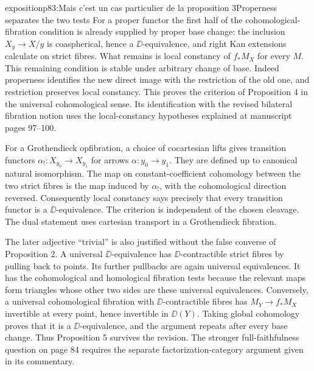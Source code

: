 \begin{dcomment}{exposition}{p83:Mais c'est un cas particulier de la proposition 3}{Properness separates the two tests}
For a proper functor the first half of the cohomological-fibration condition is already supplied by proper base change: the inclusion $X_y\to X/y$ is coaspherical, hence a $\DD$-equivalence, and right Kan extensions calculate on strict fibres. What remains is local constancy of $f_*M_X$ for every $M$. This remaining condition is stable under arbitrary change of base. Indeed properness identifies the new direct image with the restriction of the old one, and restriction preserves local constancy. This proves the criterion of Proposition 4 in the universal cohomological sense. Its identification with the revised bilateral fibration notion uses the local-constancy hypotheses explained at manuscript pages 97--100.

For a Grothendieck opfibration, a choice of cocartesian lifts gives transition functors $\alpha_!:X_{y_0}\to X_{y_1}$ for arrows $\alpha:y_0\to y_1$. They are defined up to canonical natural isomorphism. The map on constant-coefficient cohomology between the two strict fibres is the map induced by $\alpha_!$, with the cohomological direction reversed. Consequently local constancy says precisely that every transition functor is a $\DD$-equivalence. The criterion is independent of the chosen cleavage. The dual statement uses cartesian transport in a Grothendieck fibration.

The later adjective ``trivial'' is also justified without the false converse of Proposition 2. A universal $\DD$-equivalence has $\DD$-contractible strict fibres by pulling back to points. Its further pullbacks are again universal equivalences. It has the cohomological and homological fibration tests because the relevant maps form triangles whose other two sides are these universal equivalences. Conversely, a universal cohomological fibration with $\DD$-contractible fibres has $M_Y\to f_*M_X$ invertible at every point, hence invertible in $\DD(Y)$. Taking global cohomology proves that it is a $\DD$-equivalence, and the argument repeats after every base change. Thus Proposition 5 survives the revision. The stronger full-faithfulness question on page 84 requires the separate factorization-category argument given in its commentary.
\end{dcomment}

